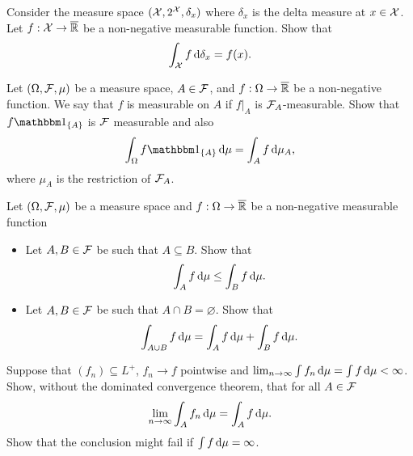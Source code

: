 \begin{problem} Consider the measure space $(\mathcal X, 2^{\mathcal X},\delta_x)$ where $\delta_x$ is the delta measure at $x\in \mathcal X$. Let $f:\mathcal X\to \overline{\mathbb R}$ be a non-negative measurable function. Show that 
\begin{equation*}
    \int_{\mathcal X} f \,\mathrm{d} \delta_x = f(x).
\end{equation*}  
\end{problem}

\begin{problem} Let $(\Omega,\mathcal F,\mu)$ be a measure space, $A\in \mathcal F$, and $f:\Omega\to \overline{\mathbb R}$ be a non-negative  function. We say that $f$ is measurable on $A$ if $f|_{A}$ is $\mathcal F_A$-measurable. Show that $f \ind{A}$ is $\mathcal F$ measurable and also 
\begin{equation*}
    \int_\Omega f  \ind{A} \,\De \mu = \int_A f \,\De \mu_A, 
\end{equation*}
where $\mu_A$ is the restriction of $\mathcal F_A$.
\end{problem}

\begin{problem}
    Let $(\Omega,\mathcal F,\mu)$ be a measure space and $f:\Omega\to \overline{\mathbb R}$ be a non-negative measurable function
    \begin{itemize}
        \item Let $A,B\in \mathcal F$ be such that $A\subseteq B$. Show that
        \begin{equation*}
            \int_{A} f\,\mathrm{d} \mu \leq  \int_{B} f\,\mathrm{d} \mu.
        \end{equation*}
        \item Let $A,B\in \mathcal F$ be such that $A\cap B = \varnothing$. Show that 
        \begin{equation*}
            \int_{A\cup B} f\,\mathrm{d} \mu =  \int_{A} f\,\mathrm{d} \mu + \int_{B} f\,\mathrm{d} \mu.
        \end{equation*}
    \end{itemize}
\end{problem}

\begin{problem}
     Suppose that $(f_n)\subseteq L^+$, $f_n\to f$ pointwise and $\lim_{n\to\infty} \int f_n\, \mathrm{d}\mu =  \int f\, \mathrm{d}\mu <\infty$. Show, without the dominated convergence theorem, that 
     for all $A\in \mathcal F$
     \begin{equation*}
         \lim_{n\to\infty} \int_A f_n\,\mathrm{d} \mu = \int_A f\,\mathrm{d} \mu.
     \end{equation*}  
     Show that the conclusion might fail if $ \int f\, \mathrm{d}\mu = \infty$.
\end{problem}

